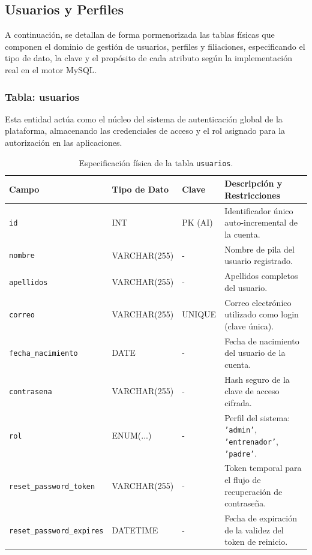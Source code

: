         \newpage
        \subsection{Usuarios y Perfiles}

        A continuación, se detallan de forma pormenorizada las tablas físicas que componen el dominio de gestión de usuarios, perfiles y filiaciones, especificando el tipo de dato, la clave y el propósito de cada atributo según la implementación real en el motor MySQL.

        \subsubsection{Tabla: usuarios}
        Esta entidad actúa como el núcleo del sistema de autenticación global de la plataforma, almacenando las credenciales de acceso y el rol asignado para la autorización en las aplicaciones.

        \begin{table}[htbp]
        \centering
        \scriptsize
        \renewcommand{\arraystretch}{1.0}
        \setlength{\tabcolsep}{4pt}
        \begin{tabularx}{\textwidth}{|l|l|l|X|}
        \hline
        \rowcolor[HTML]{EFEFEF} 
        \textbf{Campo} & \textbf{Tipo de Dato} & \textbf{Clave} & \textbf{Descripción y Restricciones} \\ \hline
        \texttt{id} & INT & PK (AI) & Identificador único auto-incremental de la cuenta. \\ \hline
        \texttt{nombre} & VARCHAR(255) & - & Nombre de pila del usuario registrado. \\ \hline
        \texttt{apellidos} & VARCHAR(255) & - & Apellidos completos del usuario. \\ \hline
        \texttt{correo} & VARCHAR(255) & UNIQUE & Correo electrónico utilizado como login (clave única). \\ \hline
        \texttt{fecha\_nacimiento} & DATE & - & Fecha de nacimiento del usuario de la cuenta. \\ \hline
        \texttt{contrasena} & VARCHAR(255) & - & Hash seguro de la clave de acceso cifrada. \\ \hline
        \texttt{rol} & ENUM(...) & - & Perfil del sistema: \texttt{'admin'}, \texttt{'entrenador'}, \texttt{'padre'}. \\ \hline
        \texttt{reset\_password\_token} & VARCHAR(255) & - & Token temporal para el flujo de recuperación de contraseña. \\ \hline
        \texttt{reset\_password\_expires} & DATETIME & - & Fecha de expiración de la validez del token de reinicio. \\ \hline
        \end{tabularx}
        \caption{Especificación física de la tabla \texttt{usuarios}.}
        \label{tab:dic_usuarios}
        \end{table}

